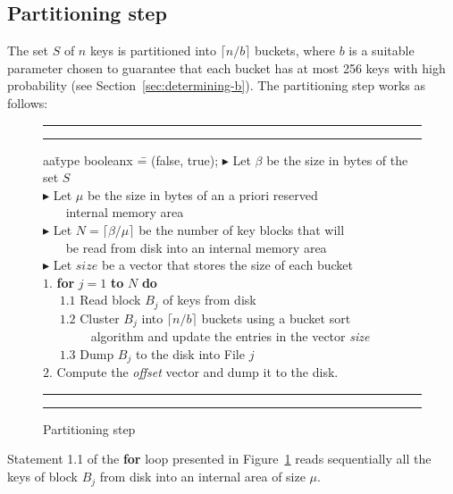 \vspace{-2mm}
\subsection{Partitioning step}
\label{sec:partitioning-keys}

The set $S$ of $n$ keys is partitioned into $\lceil n/b \rceil$ buckets, 
where $b$ is a suitable parameter chosen to guarantee
that each bucket has at most 256 keys with high probability
(see Section~\ref{sec:determining-b}).
The partitioning step works as follows:

\begin{figure}[h]
\hrule 
\hrule 
\vspace{2mm}
\begin{tabbing}
aa\=type booleanx \==  (false, true); \kill
\> $\blacktriangleright$ Let $\beta$ be the size in bytes of the set $S$ \\ 
\> $\blacktriangleright$ Let $\mu$ be the size in bytes of an a priori reserved \\
\> ~~~ internal memory area \\ 
\> $\blacktriangleright$ Let $N = \lceil \beta/\mu \rceil$ be the number of key blocks that will \\
\> ~~~ be read from disk into an internal memory area \\
\> $\blacktriangleright$ Let $\mathit{size}$ be a vector that stores the size of each bucket \\
\> $1.$ {\bf for} $j = 1$ {\bf to} $N$ {\bf do} \\
\> ~~ $1.1$ Read block $B_j$ of keys from disk \\
\> ~~ $1.2$ Cluster $B_j$ into $\lceil n/b \rceil$ buckets using a bucket sort \\
\> ~~~~~~~ algorithm and update the entries in the vector {\it size} \\
\> ~~ $1.3$ Dump $B_j$ to the disk into File $j$\\
\> $2.$ Compute the {\it offset} vector and dump it to the disk.
\end{tabbing}
\hrule 
\hrule 
\vspace{-1.0mm}
\caption{Partitioning step}
\vspace{-3mm}
\label{fig:partitioningstep}
\end{figure}

Statement 1.1 of the {\bf for} loop presented in Figure~\ref{fig:partitioningstep} 
reads sequentially all the keys of block $B_j$ from disk into an internal area
of size $\mu$.

